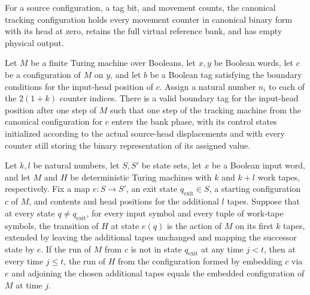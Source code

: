 \begin{definition}
\label{Complexity.clTrackCfg}
\leanok
{}
For a source configuration, a tag bit, and movement counts, the canonical tracking configuration holds every movement counter in canonical binary form with its head at zero, retains the full virtual reference bank, and has empty physical output.
\end{definition}

\begin{lemma}
\label{Complexity.clTrack_source}
\leanok
{}
Let $M$ be a finite Turing machine over Booleans, let $x,y$ be Boolean words, let $c$ be
a configuration of $M$ on $y$, and let $b$ be a Boolean tag satisfying the boundary
conditions for the input-head position of $c$. Assign a natural number $n_i$ to each of
the $2(1+k)$ counter indices. There is a valid boundary tag for the input-head position
after one step of $M$ such that one step of the tracking machine from the canonical
configuration for $c$ enters the bank phase, with its control states initialized
according to the actual source-head displacements and with every counter still storing
the binary representation of its assigned value.
\end{lemma}

\begin{lemma}
\label{Complexity.clLeft_until}
\leanok
{}
Let $k,l$ be natural numbers, let $S,S'$ be state sets, let $x$ be a Boolean input word,
and let $M$ and $H$ be deterministic Turing machines with $k$ and $k+l$ work tapes,
respectively. Fix a map $e:S\to S'$, an exit state $q_{\mathrm{exit}}\in S$, a starting
configuration $c$ of $M$, and contents and head positions for the additional $l$ tapes.
Suppose that at every state $q\ne q_{\mathrm{exit}}$, for every input symbol and every
tuple of work-tape symbols, the transition of $H$ at state $e(q)$ is the action of $M$
on its first $k$ tapes, extended by leaving the additional tapes unchanged and mapping
the successor state by $e$. If the run of $M$ from $c$ is not in state
$q_{\mathrm{exit}}$ at any time $j<t$, then at every time $j\le t$, the run of $H$ from
the configuration formed by embedding $c$ via $e$ and adjoining the chosen additional
tapes equals the embedded configuration of $M$ at time $j$.
\end{lemma}

